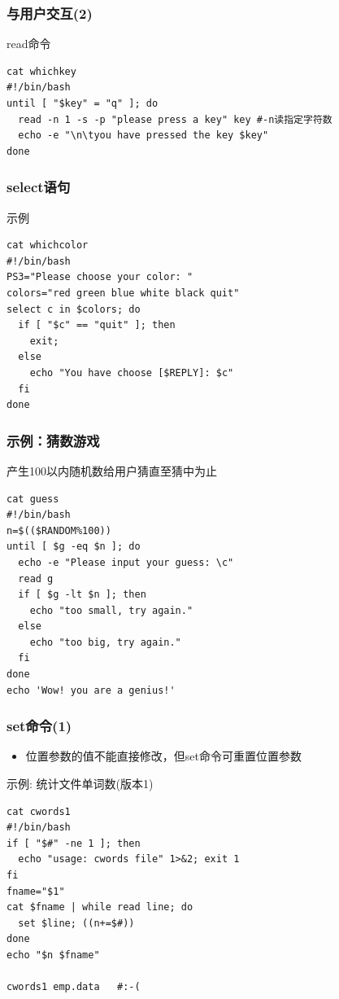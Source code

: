 \documentclass[xcolor=svgnames,presentation]{beamer}
\begin{document}
\begin{frame}[fragile]
\frametitle{与用户交互(2)}
\label{sec-1-2-41}
\begin{exampleblock}{read命令}
\label{sec-1-2-41-1}


\begin{verbatim}
cat whichkey
#!/bin/bash
until [ "$key" = "q" ]; do
  read -n 1 -s -p "please press a key" key #-n读指定字符数
  echo -e "\n\tyou have pressed the key $key"
done
\end{verbatim}
\end{exampleblock}
\end{frame}
\begin{frame}[fragile]
\frametitle{select语句}
\label{sec-1-2-42}
\begin{exampleblock}{示例}
\label{sec-1-2-42-1}


\begin{verbatim}
cat whichcolor
#!/bin/bash
PS3="Please choose your color: "
colors="red green blue white black quit"
select c in $colors; do
  if [ "$c" == "quit" ]; then
    exit;
  else
    echo "You have choose [$REPLY]: $c"
  fi
done
\end{verbatim}
\end{exampleblock}
\end{frame}
\begin{frame}[fragile]
\frametitle{示例：猜数游戏}
\label{sec-1-2-43}
\begin{exampleblock}{产生100以内随机数给用户猜直至猜中为止}
\label{sec-1-2-43-1}


\begin{verbatim}
cat guess
#!/bin/bash
n=$(($RANDOM%100))
until [ $g -eq $n ]; do
  echo -e "Please input your guess: \c"
  read g
  if [ $g -lt $n ]; then
    echo "too small, try again."
  else
    echo "too big, try again."
  fi
done
echo 'Wow! you are a genius!'
\end{verbatim}
\end{exampleblock}
\end{frame}
\begin{frame}[fragile]
\frametitle{set命令(1)}
\label{sec-1-2-44}
\begin{itemize}

\item 位置参数的值不能直接修改，但set命令可重置位置参数
\label{sec-1-2-44-1}%
\end{itemize} %
\begin{exampleblock}{示例: 统计文件单词数(版本1)}
\label{sec-1-2-44-2}


\begin{verbatim}
cat cwords1
#!/bin/bash
if [ "$#" -ne 1 ]; then
  echo "usage: cwords file" 1>&2; exit 1
fi
fname="$1"
cat $fname | while read line; do
  set $line; ((n+=$#))
done
echo "$n $fname"

cwords1 emp.data   #:-(
\end{verbatim}
\end{exampleblock}
\end{frame}
\end{document}
